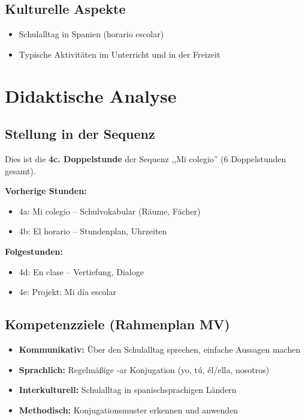 \documentclass[11pt,a4paper]{article}
\newcommand{\reihenthema}{Mi colegio}
\newcommand{\stundennummer}{4c}
\newcommand{\reihenstunden}{6}
\begin{document}
\subsection{Kulturelle Aspekte}
\begin{itemize}
    \item Schulalltag in Spanien (horario escolar)
    \item Typische Aktivitäten im Unterricht und in der Freizeit
\end{itemize}

\section{Didaktische Analyse}

\subsection{Stellung in der Sequenz}
Dies ist die \textbf{\stundennummer. Doppelstunde} der Sequenz ,,\reihenthema'' (\reihenstunden{} Doppelstunden gesamt).

\textbf{Vorherige Stunden:}
\begin{itemize}
    \item 4a: Mi colegio -- Schulvokabular (Räume, Fächer)
    \item 4b: El horario -- Stundenplan, Uhrzeiten
\end{itemize}

\textbf{Folgestunden:}
\begin{itemize}
    \item 4d: En clase -- Vertiefung, Dialoge
    \item 4e: Projekt: Mi día escolar
\end{itemize}

\subsection{Kompetenzziele (Rahmenplan MV)}
\begin{itemize}
    \item \textbf{Kommunikativ:} Über den Schulalltag sprechen, einfache Aussagen machen
    \item \textbf{Sprachlich:} Regelmäßige -ar Konjugation (yo, tú, él/ella, nosotros)
    \item \textbf{Interkulturell:} Schulalltag in spanischsprachigen Ländern
    \item \textbf{Methodisch:} Konjugationsmuster erkennen und anwenden
\end{itemize}
\end{document}
